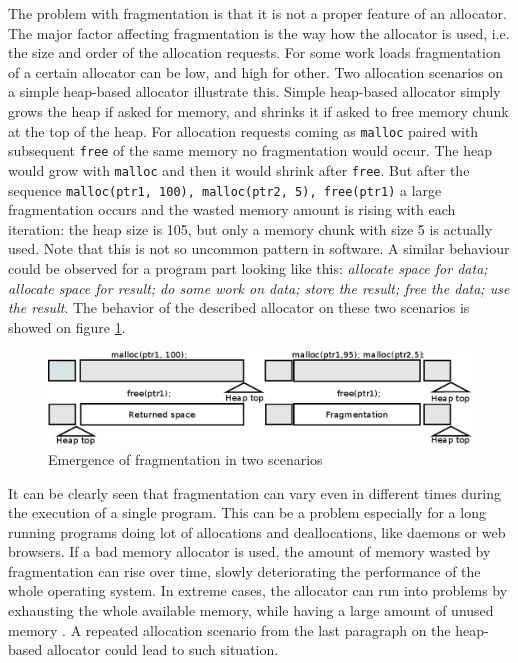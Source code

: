 The problem with fragmentation is that it is not a proper feature of an
allocator. The major factor affecting fragmentation is the way how the allocator
is used, i.e. the size and order of the allocation requests. For some work loads
fragmentation of a certain allocator can be low, and high for other. Two
allocation scenarios on a simple heap-based allocator illustrate this. Simple
heap-based allocator simply grows the heap if asked for memory, and shrinks it if
asked to free memory chunk at the top of the heap. For allocation requests coming
as {\tt malloc} paired with subsequent {\tt free} of the same memory no
fragmentation would occur. The heap would grow with {\tt malloc} and then it
would shrink after {\tt free}. But after the sequence {\tt malloc(ptr1, 100),
malloc(ptr2, 5), free(ptr1)} a large fragmentation occurs and the wasted memory
amount is rising with each iteration: the heap size is 105, but only a memory
chunk with size 5 is actually used. Note that this is not so uncommon pattern in
software. A similar behaviour could be observed for a program part looking like
this: {\em allocate space for data; allocate space for result; do some work on
data; store the result; free the data; use the result}. The behavior of the
described allocator on these two scenarios is showed on figure
\ref{fig:fragmentation}.

\begin{figure}[h]
\begin{center}
\includegraphics[keepaspectratio,width=1.0\textwidth]{fig/fragmentation}
\end{center}
\caption{Emergence of fragmentation in two scenarios}
\label{fig:fragmentation}
\end{figure}

It can be clearly seen that fragmentation can vary even in different times during
the execution of a single program. This can be a problem especially for a long
running programs doing lot of allocations and deallocations, like daemons or web
browsers. If a bad memory allocator is used, the amount of memory wasted by
fragmentation can rise over time, slowly deteriorating the performance of the
whole operating system. In extreme cases, the allocator can run into problems by
exhausting the whole available memory, while having a large amount of unused
memory \cite{DSAsurvey}. A repeated allocation scenario from the last paragraph
on the heap-based allocator could lead to such situation.

